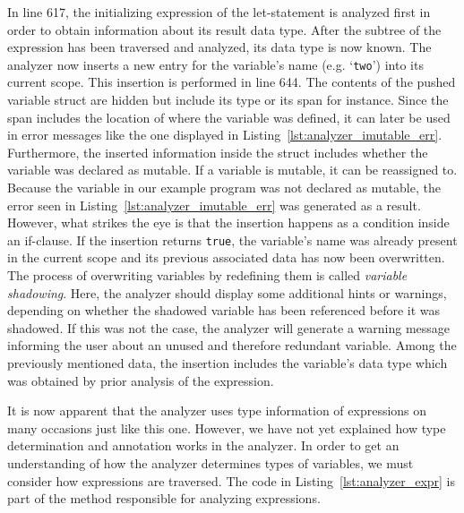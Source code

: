 In line 617, the initializing expression of the let-statement is analyzed first in order to obtain information about its result data type.
After the subtree of the expression has been traversed and analyzed, its data type is now known.
The analyzer now inserts a new entry for the variable's name (e.g. `\texttt{two}') into its current scope.
This insertion is performed in line 644.
The contents of the pushed variable struct are hidden but include its type or its span for instance.
Since the span includes the location of where the variable was defined, it can later be used in error messages like the one displayed in Listing~\ref{lst:analyzer_imutable_err}.
Furthermore, the inserted information inside the struct includes whether the variable was declared as mutable.
If a variable is mutable, it can be reassigned to.
Because the variable in our example program was not declared as mutable,
the error seen in Listing~\ref{lst:analyzer_imutable_err} was generated as a result.
However, what strikes the eye is that the insertion happens as a condition inside an if-clause.
If the insertion returns \texttt{true}, the variable's name was already present in the current scope and its previous associated data has now been overwritten.
The process of overwriting variables by redefining them is called \emph{variable shadowing}.
Here, the analyzer should display some additional hints or warnings, depending on whether the shadowed variable has been referenced before it was shadowed.
If this was not the case, the analyzer will generate a warning message informing the user about an unused and therefore redundant variable.
Among the previously mentioned data, the insertion includes the variable's data type which was obtained by prior analysis of the expression.

It is now apparent that the analyzer uses type information of expressions on many occasions just like this one.
However, we have not yet explained how type determination and annotation works in the analyzer.
In order to get an understanding of how the analyzer determines types of variables, we must consider how expressions are traversed.
The code in Listing~\ref{lst:analyzer_expr} is part of the method responsible for analyzing expressions.



